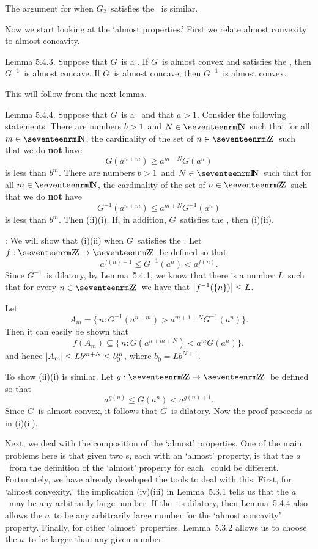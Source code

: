 The argument for when $G_2$\ satisfies the \Deltacond\ is similar.
\endproof

Now we start looking at the `almost properties.' First we relate almost
convexity to almost concavity.

\proclaim Lemma 5.4.3. Suppose that $G$\ is a \phifunction.
\itemi If $G$\ is almost convex and satisfies the \Deltacond, 
then $G^{-1}$\ is almost concave.
\itemii If $G$\ is almost concave, then $G^{-1}$\ is almost convex.
\moreproclaim

This will follow from the next lemma.

\proclaim Lemma 5.4.4. Suppose that $G$\ is a \phifunction\ and that $a>1$.
Consider the following statements.
\itemi There are numbers $b>1$\ and
$N\in\N$\ such that for all $m\in\N$, the cardinality of the set of $n\in\Z$\
such that we do {\bf not} have
$$ G(a^{n+m}) \ge a^{m-N} G(a^n) $$
is less than $b^m$.
\itemii There are numbers $b>1$\ and
$N\in\N$\ such that for all $m\in\N$, the cardinality of the set of $n\in\Z$\
such that we do {\bf not} have
$$ G^{-1}(a^{n+m}) \le a^{m+N} G^{-1}(a^n) $$
is less than $b^m$.
\moreproclaim\noindent
Then (ii)\implies(i). If, in addition, $G$\ satisfies the \Deltacond, then
(i)\implies(ii).

\Proof: We will show that (i)\implies(ii) when $G$\ satisfies the \Deltacond.
Let $f:\Z\to\Z$\ be defined so that 
$$ a^{f(n)-1} \le G^{-1}(a^n) < a^{f(n)} .$$
Since $G^{-1}$\ is dilatory, by Lemma~5.4.1, we know that there is a number $L$\
such that for every $n\in\Z$\ we have that $\left| f^{-1}(\{n\}) \right| \le L$.

Let 
$$ A_m = \{\, n: G^{-1}(a^{n+m}) > a^{m+1+N} G^{-1}(a^n) \}.$$
Then it can easily be shown that 
$$ f(A_m) \subseteq \{\, n : G(a^{n+m+N}) < a^m G(a^{n})\} ,$$
and hence $\left| A_m \right| \le L b^{m+N} \le b_0^m$, where $b_0 = L b^{N+1}$.

To show (ii)\implies(i) is similar. Let $g:\Z\to\Z$\ be defined so that
$$ a^{g(n)} \le G(a^n) < a^{g(n)+1} .$$
Since $G$\ is almost convex, it follows that $G$\ is dilatory. 
Now the proof proceeds as in (i)\implies(ii).
\endproof

Next, we deal with the composition of the `almost' properties.  One of
the main problems here is that given two \phifunction s, each with an
`almost' property, is that the $a$\ from the definition of the `almost'
property for each \phifunction\ could be different.  Fortunately, 
we have already developed the tools to deal
with this.  First, for `almost convexity,' the implication (iv)\implies(iii)
in Lemma~5.3.1 tells us that the $a$\ may be any arbitrarily large
number.  If the \phifunction\ is dilatory, then Lemma~5.4.4 also
allows the $a$\ to be any arbitrarily large number for the `almost concavity'
property.  Finally, for other `almost' properties. Lemma~5.3.2 allows us to
choose the $a$\ to be larger than any given number.

